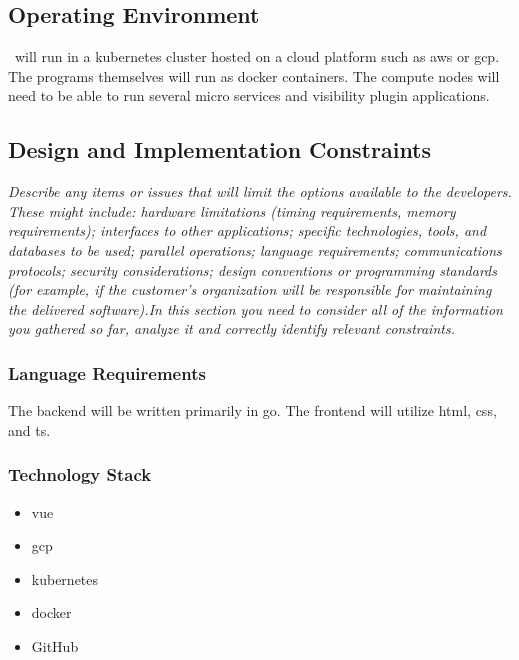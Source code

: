     \subsection{Operating Environment}\label{sec:operating-environment}
        \projectName\ will run in a \gls{kubernetes} cluster hosted on a cloud platform such as \gls{aws} or \gls{gcp}. The programs themselves will run as \gls{docker} containers. The compute nodes will need to be able to run several micro services and visibility plugin applications.
    \subsection{Design and Implementation Constraints}\label{sec:design-constraints}
        \emph{Describe any items or issues that will limit the options available to the developers. These might include: hardware limitations (timing requirements, memory requirements); interfaces to other applications; specific technologies, tools, and databases to be used; parallel operations; language requirements; communications protocols; security considerations; design conventions or programming standards (for example, if the customer’s organization will be responsible for maintaining the delivered software).\gnl In this section you need to consider all of the information you gathered so far, analyze it and correctly identify relevant constraints.}
        \subsubsection{Language Requirements}
            The backend will be written primarily in \gls{go}. The frontend will utilize \acrshort{html}, \acrshort{css}, and \acrfull{ts}.
        \subsubsection{Technology Stack}
            \begin{itemize}
                \item \gls{vue}
                \item \gls{gcp}
                \item \gls{kubernetes}
                \item \gls{docker}
                \item GitHub
            \end{itemize}
